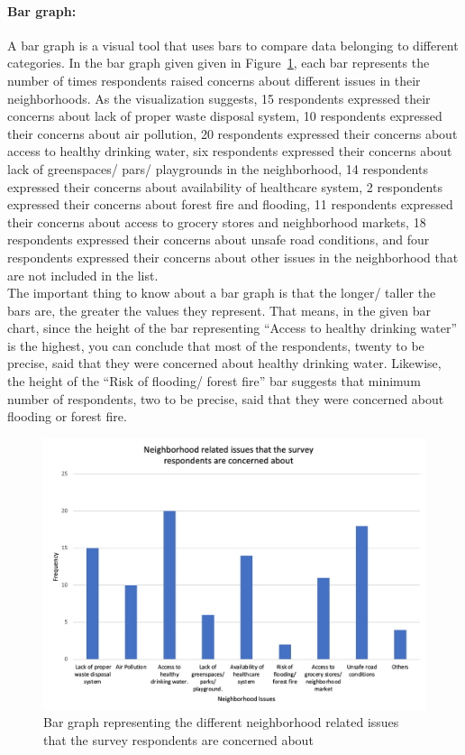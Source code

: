 \documentclass[a4paper, 11pt]{article}
\begin{document}
	\paragraph{Bar graph:} A bar graph is a visual tool that uses bars to compare data belonging to different categories. In the bar graph given given in Figure~\ref{fig:Bar}, each bar represents the number of times respondents raised concerns about different issues in their neighborhoods. As the visualization suggests, 15 respondents expressed their concerns about lack of proper waste disposal system, 10 respondents expressed their concerns about air pollution, 20 respondents expressed their concerns about access to healthy drinking water, six respondents expressed their concerns about lack of greenspaces/ pars/ playgrounds in the neighborhood, 14 respondents expressed their concerns about availability of healthcare system, 2 respondents expressed their concerns about forest fire and flooding, 11 respondents expressed their concerns about access to grocery stores and neighborhood markets, 18 respondents expressed their concerns about unsafe road conditions, and four respondents expressed their concerns about other issues in the neighborhood that are not included in the list.\\[1ex] 
	The important thing to know about a bar graph is that the longer/ taller the bars are, the greater the values they represent. That means, in the given bar chart, since the height of the bar representing “Access to healthy drinking water” is the highest, you can conclude that most of the respondents, twenty to be precise, said that they were concerned about healthy drinking water. Likewise, the height of the “Risk of flooding/ forest fire” bar suggests that minimum number of respondents, two to be precise, said that they were concerned about flooding or forest fire.
	\begin{figure}[h!]
		\includegraphics[width=\linewidth]{Bar_new.jpg}
		\caption{Bar graph representing the different neighborhood related issues that the survey respondents are concerned about} 
		\label{fig:Bar}
	\end{figure}
\end{document}
